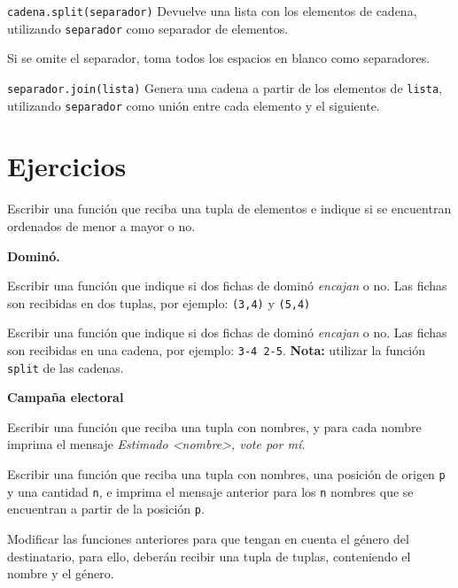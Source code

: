 \begin{referencia_python}
\begin{sintaxis}{\lstinline!cadena.split(separador)!}
Devuelve una lista con los elementos de cadena, utilizando
\lstinline!separador! como separador de elementos.

Si se omite el separador, toma todos los espacios en blanco como
separadores.
\end{sintaxis}

\begin{sintaxis}{\lstinline!separador.join(lista)!}
Genera una cadena a partir de los elementos de \lstinline!lista!,
utilizando \lstinline!separador! como unión entre cada elemento y el
siguiente.
\end{sintaxis}
\end{referencia_python}


\newpage
\section{Ejercicios}

\begin{ejercicio}
Escribir una función que reciba una tupla de elementos e indique si se
encuentran ordenados de menor a mayor o no.
\end{ejercicio}


\begin{ejercicio}
{\bf Dominó.}
\begin{partes}
\item Escribir una función que indique si dos fichas de dominó {\it
encajan} o no. Las fichas son recibidas en dos tuplas, por ejemplo:
\verb!(3,4)! y \verb!(5,4)!
\item Escribir una función que indique si dos fichas de dominó {\it
encajan} o no. Las fichas son recibidas en una cadena, por ejemplo:
\verb!3-4 2-5!. {\bf Nota:} utilizar la función \verb!split! de las cadenas.
\end{partes}
\end{ejercicio}


\begin{ejercicio}{\bf Campaña electoral}
\begin{partes}
\item Escribir una función que reciba una tupla con nombres, y para cada
nombre imprima el mensaje {\it Estimado <nombre>, vote por mí.}
\item Escribir una función que reciba una tupla con nombres, una posición
de origen \verb!p! y una cantidad \verb!n!, e imprima el mensaje anterior
para los \verb!n! nombres que se encuentran a partir de la posición
\verb!p!.
\item Modificar las funciones anteriores para que tengan en cuenta el
género del destinatario, para ello, deberán recibir una tupla de tuplas,
conteniendo el nombre y el género.
\end{partes}
\end{ejercicio}


